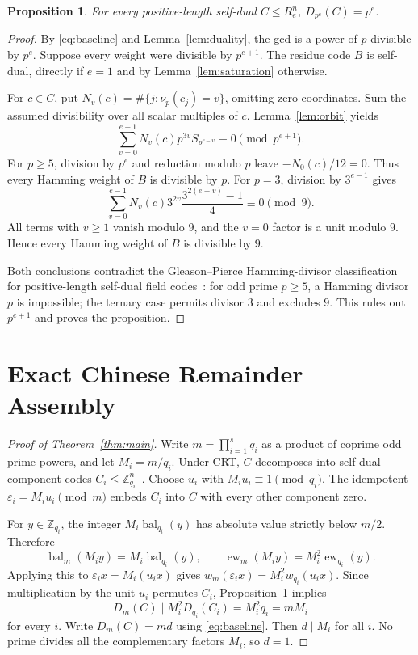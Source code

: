 \documentclass[12pt,letterpaper,onecolumn]{article}
\newtheorem{proposition}[theorem]{Proposition}
\newcommand{\Z}{\mathbb{Z}}
\newcommand{\bal}{\operatorname{bal}}
\newcommand{\ew}{\operatorname{ew}}
\begin{document}
\begin{proposition}\label{prop:pp}
For every positive-length self-dual $C\le R_e^n$, $D_{p^e}(C)=p^e$.
\end{proposition}
\begin{proof}
By \eqref{eq:baseline} and Lemma~\ref{lem:duality}, the gcd is a power of $p$ divisible by $p^e$. Suppose every weight were divisible by $p^{e+1}$. The residue code $B$ is self-dual, directly if $e=1$ and by Lemma~\ref{lem:saturation} otherwise.

For $c\in C$, put $N_v(c)=\#\{j:\nu_p(c_j)=v\}$, omitting zero coordinates. Sum the assumed divisibility over all scalar multiples of $c$. Lemma~\ref{lem:orbit} yields
\begin{equation}
 \sum_{v=0}^{e-1}N_v(c)p^{3v}S_{p^{e-v}}\equiv0\pmod{p^{e+1}}.
 \label{eq:sumorbit}
\end{equation}
For $p\ge5$, division by $p^e$ and reduction modulo $p$ leave $-N_0(c)/12=0$. Thus every Hamming weight of $B$ is divisible by $p$. For $p=3$, division by $3^{e-1}$ gives
\[
 \sum_{v=0}^{e-1}N_v(c)3^{2v}
 \frac{3^{2(e-v)}-1}{4}\equiv0\pmod9.
\]
All terms with $v\ge1$ vanish modulo $9$, and the $v=0$ factor is a unit modulo $9$. Hence every Hamming weight of $B$ is divisible by $9$.

Both conclusions contradict the Gleason--Pierce Hamming-divisor classification for positive-length self-dual field codes~\cite{NebeRainsSloane2006,Ward1999}: for odd prime $p\ge5$, a Hamming divisor $p$ is impossible; the ternary case permits divisor $3$ and excludes $9$. This rules out $p^{e+1}$ and proves the proposition.
\end{proof}

\section{Exact Chinese Remainder Assembly}
\begin{proof}[Proof of Theorem~\ref{thm:main}]
Write $m=\prod_{i=1}^s q_i$ as a product of coprime odd prime powers, and let $M_i=m/q_i$. Under CRT, $C$ decomposes into self-dual component codes $C_i\le\Z_{q_i}^n$~\cite{DoughertyHaradaSole1999}. Choose $u_i$ with $M_iu_i\equiv1\pmod{q_i}$. The idempotent $\varepsilon_i=M_iu_i\pmod m$ embeds $C_i$ into $C$ with every other component zero.

For $y\in\Z_{q_i}$, the integer $M_i\bal_{q_i}(y)$ has absolute value strictly below $m/2$. Therefore
\begin{equation}
 \bal_m(M_i y)=M_i\bal_{q_i}(y),\qquad
 \ew_m(M_i y)=M_i^2\ew_{q_i}(y).
 \label{eq:crtweight}
\end{equation}
Applying this to $\varepsilon_i x=M_i(u_ix)$ gives $w_m(\varepsilon_i x)=M_i^2w_{q_i}(u_ix)$. Since multiplication by the unit $u_i$ permutes $C_i$, Proposition~\ref{prop:pp} implies
\begin{equation}
 D_m(C)\mid M_i^2D_{q_i}(C_i)=M_i^2q_i=mM_i
 \label{eq:upperdivisor}
\end{equation}
for every $i$. Write $D_m(C)=md$ using \eqref{eq:baseline}. Then $d\mid M_i$ for all $i$. No prime divides all the complementary factors $M_i$, so $d=1$.
\end{proof}
\end{document}
